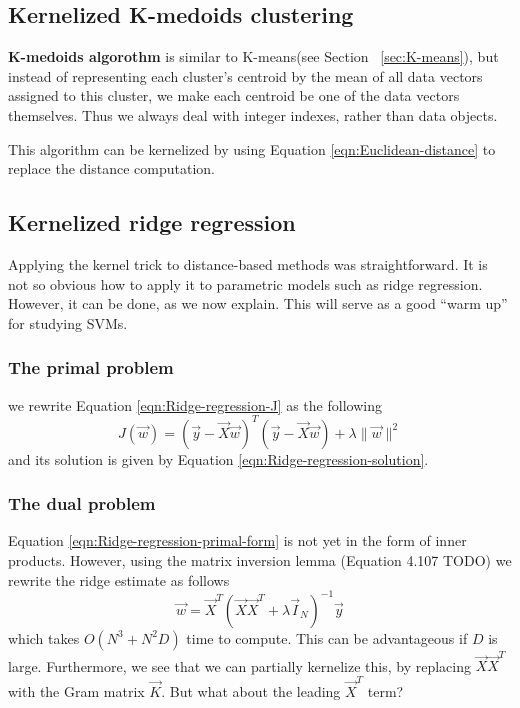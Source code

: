 \subsection{Kernelized K-medoids clustering}
\textbf{K-medoids algorothm} is similar to K-means(see Section ~\ref{sec:K-means}), but instead of representing each cluster’s centroid by the mean of all data vectors assigned to this cluster, we make each centroid be one of the data vectors themselves. Thus we always deal with integer indexes, rather than data objects.

This algorithm can be kernelized by using Equation \eqref{eqn:Euclidean-distance} to replace the distance computation.


\subsection{Kernelized ridge regression}
Applying the kernel trick to distance-based methods was straightforward. It is not so obvious how to apply it to parametric models such as ridge regression. However, it can be done, as we now explain. This will serve as a good “warm up” for studying SVMs.


\subsubsection{The primal problem}
we rewrite Equation \eqref{eqn:Ridge-regression-J} as the following
\begin{equation}\label{eqn:Ridge-regression-primal-form}
J(\vec{w})=(\vec{y}-\vec{X}\vec{w})^T(\vec{y}-\vec{X}\vec{w})+\lambda\lVert\vec{w}\rVert^2
\end{equation}
and its solution is given by Equation \eqref{eqn:Ridge-regression-solution}.


\subsubsection{The dual problem}
Equation \eqref{eqn:Ridge-regression-primal-form} is not yet in the form of inner products. However, using the matrix inversion lemma (Equation 4.107 TODO) we rewrite the ridge estimate as follows
\begin{equation}
\vec{w}=\vec{X}^T(\vec{X}\vec{X}^T+\lambda\vec{I}_N)^{-1}\vec{y}
\end{equation}
which takes $O(N^3+N^2D)$ time to compute. This can be advantageous if $D$ is large. Furthermore, we see that we can partially kernelize this, by replacing $\vec{X}\vec{X}^T$ with the Gram matrix $\vec{K}$. But what about the leading $\vec{X}^T$ term?

